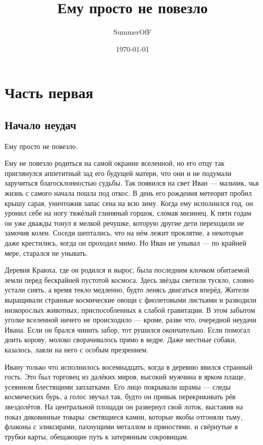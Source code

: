 \documentclass[12pt,a4paper]{book}
\title{Ему просто не повезло}
\author{SummerOfF}
\date{\today}
\begin{document}
\maketitle
\tableofcontents

\part{Часть первая}

\chapter{Начало неудач}

Ему просто не повезло.

Ему не повезло родиться на самой окраине вселенной, но его отцу так приглянулся аппетитный зад его будущей матери, что они и не подумали заручиться благосклонностью судьбы. Так появился на свет Иван --- мальчик, чья жизнь с самого начала пошла под откос. В день его рождения метеорит пробил крышу сарая, уничтожив запас сена на всю зиму. Когда ему исполнился год, он уронил себе на ногу тяжёлый глиняный горшок, сломав мизинец. К пяти годам он уже дважды тонул в мелкой речушке, которую другие дети переходили не замочив колен. Соседи шептались, что на нём лежит проклятие, а некоторые даже крестились, когда он проходил мимо. Но Иван не унывал --- по крайней мере, старался не унывать.

Деревня Краюха, где он родился и вырос, была последним клочком обитаемой земли перед бескрайней пустотой космоса. Здесь звёзды светили тускло, словно устали сиять, а время текло медленно, будто ленясь двигаться вперёд. Жители выращивали странные космические овощи с фиолетовыми листьями и разводили низкорослых животных, приспособленных к слабой гравитации. В этом забытом уголке вселенной ничего не происходило --- кроме, разве что, очередной неудачи Ивана. Если он брался чинить забор, тот рушился окончательно. Если помогал доить корову, молоко сворачивалось прямо в ведре. Даже местные собаки, казалось, лаяли на него с особым презрением.

Ивану только что исполнилось восемнадцать, когда в деревню явился странный гость. Это был торговец из далёких миров, высокий мужчина в ярком плаще, усеянном блестящими заплатками. Его лицо покрывали шрамы --- следы космических бурь, а голос звучал так, будто он привык перекрикивать рёв звездолётов. На центральной площади он развернул свой лоток, выставив на показ диковинные товары: светящиеся камни, которые якобы отгоняли тьму, флаконы с эликсирами, пахнущими металлом и пряностями, и свёрнутые в трубки карты, обещающие путь к затерянным сокровищам.
\end{document}
